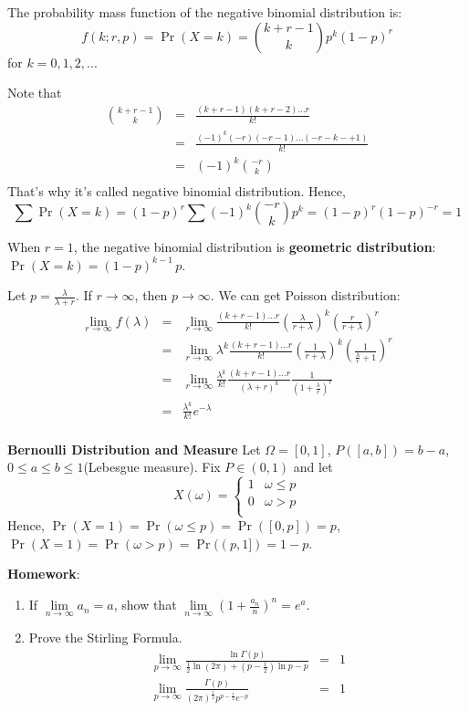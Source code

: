 \documentclass[11pt]{article}
\begin{document}
The probability mass function of the negative binomial distribution is:
\[f(k; r,p) = \Pr(X = k) = {k+r-1 \choose k} p^k (1-p)^r\]
for $k = 0, 1, 2, ...$

Note that \begin{eqnarray*}
{k+r-1 \choose k}&=&\frac{(k+r-1)(k+r-2)\dots r}{k!} \\
&=&\frac{(-1)^{k}(-r)(-r-1)\dots(-r-k-+1)}{k!}\\
&=&(-1)^k{-r \choose k}\\
\end{eqnarray*}
That's why it's called negative binomial distribution. Hence, $$\sum{\Pr(X=k)}=(1-p)^r\sum{(-1)^k{-r \choose k}p^k}=(1-p)^r(1-p)^{-r}=1$$

When $r=1$, the negative binomial distribution is \textbf{geometric distribution}:$\Pr(X = k) = (1-p)^{k-1}\,p$.

Let $p=\frac{\lambda}{\lambda+r}$. If $r \rightarrow \infty$, then $p \rightarrow \infty$. We can get Poisson distribution:
\begin{eqnarray*}
\lim_{r\rightarrow\infty}f(\lambda) &=& \lim_{r\rightarrow\infty}\frac{(k+r-1)\dots r}{k!}\left(\frac{\lambda}{r+\lambda}\right)^k\left(\frac{r}{r+\lambda}\right)^r \\
&=&\lim_{r\rightarrow\infty}\lambda^k\frac{(k+r-1)\dots r}{k!}\left(\frac{1}{r+\lambda}\right)^k\left(\frac{1}{\frac{\lambda}{r}+1}\right)^r \\
&=&\lim_{r\rightarrow\infty}\frac{\lambda^k}{k!}\frac{(k+r-1)\dots r}{(\lambda+r)^k}\frac{1}{\left(1+\frac{\lambda}{r}\right)^r} \\
&=&\frac{\lambda^k}{k!}e^{-\lambda} \\
\end{eqnarray*} 

\textbf{Bernoulli Distribution and Measure}
Let $\Omega=[0, 1]$, $P([a,b])=b-a$, $0\le a\le b\le 1$(Lebesgue measure).
Fix $P \in (0,1)$ and let \[X(\omega) = \left\{\begin{array}{cc}
1 & \omega\le p \\
0 & \omega > p \\
\end{array}
\right.
\]
Hence, $\Pr(X=1)=\Pr(\omega\le p)=\Pr([0,p])=p$, $\Pr(X=1)=\Pr(\omega> p)=\Pr((p,1])=1-p$.

\textbf{Homework}:
\begin{enumerate}[(1)]
\item
If $\lim \limits_{n\rightarrow\infty}a_n=a$, show that $\lim \limits_{n\rightarrow\infty}\left(1+\frac{a_n}{n}\right)^n=e^{a}$.
\item
Prove the Stirling Formula.
\begin{eqnarray*}
\lim_{p\rightarrow\infty}\frac{\ln\Gamma(p)}{\frac{1}{2}\ln(2\pi)+(p-\frac{1}{2})\ln{p}-p}&=&1\\
\lim_{p\rightarrow\infty}\frac{\Gamma(p)}{(2\pi)^{\frac{1}{2}}p^{p-\frac{1}{2}}e^{-p}}&=&1
\end{eqnarray*}
\end{enumerate}
\end{document}

